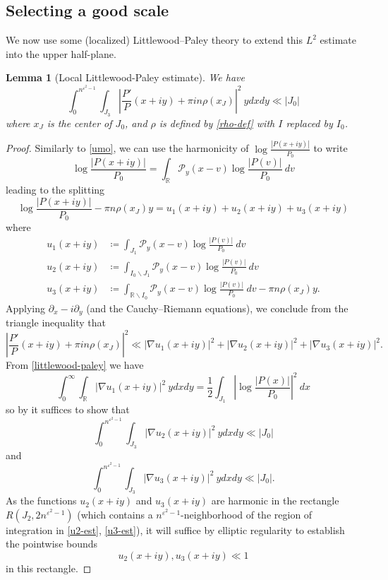 \documentclass[12pt]{amsart}
\newtheorem{lemma}[theorem]{Lemma}
\newcommand{\eps}{\varepsilon}
\newcommand{\R}{\mathbb{R}}
\newcommand{\Poisson}{\mathcal{P}}
\begin{document}
\subsection{Selecting a good scale}

We now use some (localized) Littlewood--Paley theory to extend this $L^2$ estimate into the upper half-plane.

\begin{lemma}[Local Littlewood-Paley estimate] We have
$$ \int_0^{n^{\eps^2-1}} \int_{J_3} \left|\frac{P'}{P}(x+iy) + \pi in\rho(x_J)\right|^2\ y dx dy \ll |J_0|$$
where $x_J$ is the center of $J_0$, and $\rho$ is defined by \eqref{rho-def} with $I$ replaced by $I_0$.
\end{lemma}

\begin{proof}  Similarly to \eqref{umo}, we can use the harmonicity of $\log \frac{|P(x+iy)|}{P_0}$ to write
$$ \log \frac{|P(x+iy)|}{P_0} = \int_\R \Poisson_y(x-v) \log \frac{|P(v)|}{P_0}\ dv$$
leading to the splitting
$$ \log \frac{|P(x+iy)|}{P_0} - \pi n \rho(x_J) y = u_1(x+iy) + u_2(x+iy) + u_3(x+iy)$$
where
\begin{align*}
     u_1(x+iy) &\coloneqq \int_{J_1} \Poisson_y(x-v) \log \frac{|P(v)|}{P_0}\ dv \\
     u_2(x+iy) &\coloneqq \int_{I_0 \backslash J_1} \Poisson_y(x-v) \log \frac{|P(v)|}{P_0}\ dv \\
     u_3(x+iy) &\coloneqq \int_{\R \backslash I_0} \Poisson_y(x-v) \log \frac{|P(v)|}{P_0}\ dv - \pi n \rho(x_J) y.
\end{align*}
Applying $\partial_x - i \partial_y$ (and the Cauchy--Riemann equations), we conclude from the triangle inequality that
$$ \left|\frac{P'}{P}(x+iy) + \pi in\rho(x_J)\right|^2 \ll |\nabla u_1(x+iy)|^2 + |\nabla u_2(x+iy)|^2 + |\nabla u_3(x+iy)|^2.$$
From \eqref{littlewood-paley} we have
$$ \int_0^\infty \int_\R |\nabla u_1(x+iy)|^2\ y dx dy = \frac{1}{2} \int_{J_1} \left|\log \frac{|P(x)|}{P_0}\right|^2\ dx$$
so by  it suffices to show that
\begin{equation}\label{u2-est} \int_0^{n^{\eps^2-1}} \int_{J_3} |\nabla u_2(x+iy)|^2\ y dx dy \ll |J_0| \end{equation}
and
\begin{equation}\label{u3-est} \int_0^{n^{\eps^2-1}} \int_{J_3} |\nabla u_3(x+iy)|^2\ y dx dy \ll |J_0|.\end{equation}
As the functions $u_2(x+iy)$ and $u_3(x+iy)$ are harmonic in the rectangle $R( J_2, 2 n^{\eps^2-1} )$ (which contains a $n^{\eps^2-1}$-neighborhood of the region of integration in \eqref{u2-est}, \eqref{u3-est}), it will suffice by elliptic regularity to establish the pointwise bounds
\begin{equation}\label{ellip} u_2(x+iy), u_3(x+iy) \ll 1
\end{equation}
in this rectangle.


\end{proof}
\end{document}
